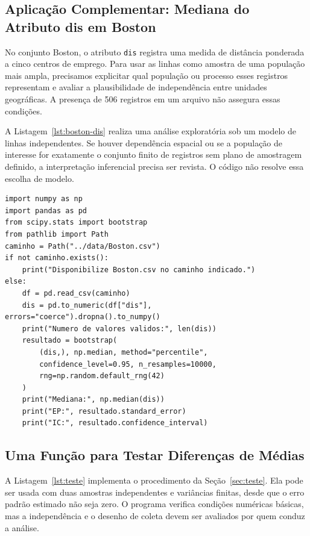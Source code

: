 \documentclass[12pt,a4paper]{article}
\begin{document}
\subsection{Aplicação Complementar: Mediana do Atributo dis em Boston}
No conjunto Boston, o atributo \texttt{dis} registra uma medida de distância ponderada a cinco centros de emprego. Para usar as linhas como amostra de uma população mais ampla, precisamos explicitar qual população ou processo esses registros representam e avaliar a plausibilidade de independência entre unidades geográficas. A presença de 506 registros em um arquivo não assegura essas condições.

A Listagem~\ref{lst:boston-dis} realiza uma análise exploratória sob um modelo de linhas independentes. Se houver dependência espacial ou se a população de interesse for exatamente o conjunto finito de registros sem plano de amostragem definido, a interpretação inferencial precisa ser revista. O código não resolve essa escolha de modelo.

\begin{lstlisting}[caption={Aplicacao ao CSV Boston, quando disponivel.},label={lst:boston-dis}]
import numpy as np
import pandas as pd
from scipy.stats import bootstrap
from pathlib import Path
caminho = Path("../data/Boston.csv")
if not caminho.exists():
    print("Disponibilize Boston.csv no caminho indicado.")
else:
    df = pd.read_csv(caminho)
    dis = pd.to_numeric(df["dis"], errors="coerce").dropna().to_numpy()
    print("Numero de valores validos:", len(dis))
    resultado = bootstrap(
        (dis,), np.median, method="percentile",
        confidence_level=0.95, n_resamples=10000,
        rng=np.random.default_rng(42)
    )
    print("Mediana:", np.median(dis))
    print("EP:", resultado.standard_error)
    print("IC:", resultado.confidence_interval)
\end{lstlisting}

\subsection{Uma Função para Testar Diferenças de Médias}
A Listagem~\ref{lst:teste} implementa o procedimento da Seção~\ref{sec:teste}. Ela pode ser usada com duas amostras independentes e variâncias finitas, desde que o erro padrão estimado não seja zero. O programa verifica condições numéricas básicas, mas a independência e o desenho de coleta devem ser avaliados por quem conduz a análise.
\end{document}
